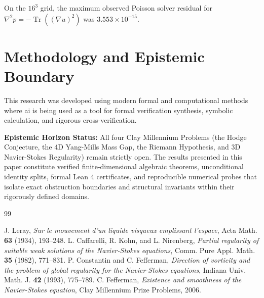 \documentclass[11pt,a4paper]{article}
\theoremstyle{definition}
\begin{document}
\noindent On the $16^3$ grid, the maximum observed Poisson solver residual for $\nabla^2 p = - \operatorname{Tr}((\nabla u)^2)$ was $3.553 \times 10^{-15}$.


\section{Methodology and Epistemic Boundary}
\noindent This research was developed using modern formal and computational methods where ai is being used as a tool for formal verification synthesis, symbolic calculation, and rigorous cross-verification.

\vspace{0.5em}
\noindent\textbf{Epistemic Horizon Status:} All four Clay Millennium Problems (the Hodge Conjecture, the 4D Yang-Mills Mass Gap, the Riemann Hypothesis, and 3D Navier-Stokes Regularity) remain strictly open. The results presented in this paper constitute verified finite-dimensional algebraic theorems, unconditional identity splits, formal Lean 4 certificates, and reproducible numerical probes that isolate exact obstruction boundaries and structural invariants within their rigorously defined domains.

\begin{thebibliography}{99}

 J. Leray, \emph{Sur le mouvement d'un liquide visqueux emplissant l'espace}, Acta Math. \textbf{63} (1934), 193--248.
 L. Caffarelli, R. Kohn, and L. Nirenberg, \emph{Partial regularity of suitable weak solutions of the Navier-Stokes equations}, Comm. Pure Appl. Math. \textbf{35} (1982), 771--831.
 P. Constantin and C. Fefferman, \emph{Direction of vorticity and the problem of global regularity for the Navier-Stokes equations}, Indiana Univ. Math. J. \textbf{42} (1993), 775--789.
 C. Fefferman, \emph{Existence and smoothness of the Navier-Stokes equation}, Clay Millennium Prize Problems, 2006.

\end{thebibliography}
\end{document}

